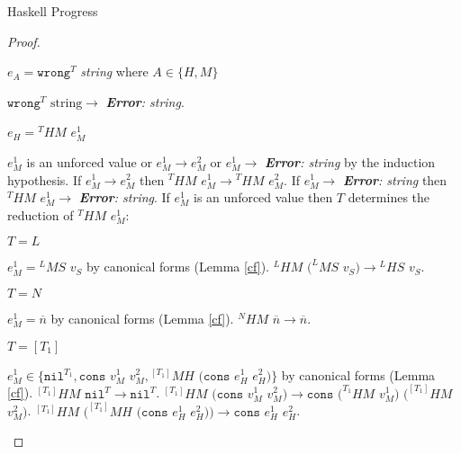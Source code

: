\begin{theorem}{Haskell Progress}
\begin{proof}

\begin{case}

$e_{A}=\mathtt{wrong}^{T}$ \emph{string} where $A\in\lbrace H,M\rbrace$

$\mathtt{wrong}^{T}$ $\mathrm{string}\rightarrow$ \emph{\textbf{Error}: string}.

\end{case}


\begin{case}

$e_{H}={^{T}H}M$ $e_{M}^{1}$

$e_{M}^{1}$ is an unforced value or $e_{M}^{1}\rightarrow e_{M}^{2}$ or $e_{M}^{1}\rightarrow$ \emph{\textbf{Error}: string} by the induction hypothesis.  If $e_{M}^{1}\rightarrow e_{M}^{2}$ then $^{T}HM$ $e_{M}^{1}\rightarrow{^{T}H}M$ $e_{M}^{2}$.  If $e_{M}^{1}\rightarrow$ \emph{\textbf{Error}: string} then $^{T}HM$ $e_{M}^{1}\rightarrow$ \emph{\textbf{Error}: string}.  If $e_{M}^{1}$ is an unforced value then $T$ determines the reduction of $^{T}HM$ $e_{M}^{1}$:

\begin{subcase}

$T=L$

$e_{M}^{1}={^{L}M}S$ $v_{S}$ by canonical forms (Lemma \ref{cf}).  $^{L}HM$ $(^{L}MS$ $v_{S})\rightarrow{^{L}H}S$ $v_{S}$.

\end{subcase}

\begin{subcase}

$T=N$

$e_{M}^{1}=\overline{n}$ by canonical forms (Lemma \ref{cf}).  $^{N}HM$ $\overline{n}\rightarrow\overline{n}$.

\end{subcase}

\begin{subcase}

$T=[T_{1}]$

$e_{M}^{1}\in\lbrace\mathtt{nil}^{T_{1}},\mathtt{cons}$ $v_{M}^{1}$ $v_{M}^{2},{^{[T_{1}]}M}H$ $(\mathtt{cons}$ $e_{H}^{1}$ $e_{H}^{2})\rbrace$ by canonical forms (Lemma \ref{cf}).  $^{[T_{1}]}HM$ $\mathtt{nil}^{T}\rightarrow\mathtt{nil}^{T}$.  $^{[T_{1}]}HM$ $(\mathtt{cons}$ $v_{M}^{1}$ $v_{M}^{2})\rightarrow\mathtt{cons}$ $(^{T_{1}}HM$ $v_{M}^{1})$ $(^{[T_{1}]}HM$ $v_{M}^{2})$.  $^{[T_{1}]}HM$ $(^{[T_{1}]}MH$ $(\mathtt{cons}$ $e_{H}^{1}$ $e_{H}^{2}))\rightarrow\mathtt{cons}$ $e_{H}^{1}$ $e_{H}^{2}$.


\end{subcase}
\end{case}
\end{proof}
\end{theorem}
